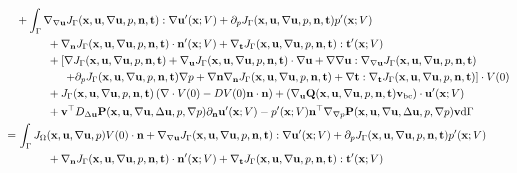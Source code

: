 \documentclass[oneside,11pt]{book}
\numberwithin{equation}{section}
\begin{document}
\begin{equation*}
{\begin{split}
            &+ \int_\Gamma \nabla_{\nabla{\bf u}}J_\Gamma({\bf x},{\bf u},\nabla{\bf u},p,{\bf n},{\bf t}):\nabla{\bf u}'({\bf x};V) + \partial_pJ_\Gamma({\bf x},{\bf u},\nabla{\bf u},p,{\bf n},{\bf t})p'({\bf x};V)\\
            &\hspace{1cm}+ \nabla_{\bf n}J_\Gamma({\bf x},{\bf u},\nabla{\bf u},p,{\bf n},{\bf t})\cdot{\bf n}'({\bf x};V) + \nabla_{\bf t}J_\Gamma({\bf x},{\bf u},\nabla{\bf u},p,{\bf n},{\bf t}):{\bf t}'({\bf x};V)\\
            &\hspace{1cm}+ \left[\nabla J_\Gamma({\bf x},{\bf u},\nabla{\bf u},p,{\bf n},{\bf t}) + \nabla_{\bf u}J_\Gamma({\bf x},{\bf u},\nabla{\bf u},p,{\bf n},{\bf t})\cdot\nabla{\bf u} + \nabla\nabla{\bf u}:\nabla_{\nabla{\bf u}}J_\Gamma({\bf x},{\bf u},\nabla{\bf u},p,{\bf n},{\bf t})\right.\\
            &\hspace{15mm} \left.+ \partial_pJ_\Gamma({\bf x},{\bf u},\nabla{\bf u},p,{\bf n},{\bf t})\nabla p + \nabla{\bf n}\nabla_{\bf n}J_\Gamma({\bf x},{\bf u},\nabla{\bf u},p,{\bf n},{\bf t}) + \nabla{\bf t}:\nabla_{\bf t}J_\Gamma({\bf x},{\bf u},\nabla{\bf u},p,{\bf n},{\bf t})\right]\cdot V(0)\\
            &\hspace{1cm}+ J_\Gamma({\bf x},{\bf u},\nabla{\bf u},p,{\bf n},{\bf t})\left(\nabla\cdot V(0) - DV(0){\bf n}\cdot{\bf n}\right) + \left(\nabla_{\bf u}{\bf Q}({\bf x},{\bf u},\nabla{\bf u},p,{\bf n},{\bf t}){\bf v}_{\rm bc}\right)\cdot{\bf u}'({\bf x};V)\\
            &\hspace{1cm}+ {\bf v}^\top D_{\Delta{\bf u}}{\bf P}({\bf x},{\bf u},\nabla{\bf u},\Delta{\bf u},p,\nabla p)\partial_{\bf n}{\bf u}'({\bf x};V) - p'({\bf x};V){\bf n}^\top\nabla_{\nabla p}{\bf P}({\bf x},{\bf u},\nabla{\bf u},\Delta{\bf u},p,\nabla p){\bf v}{\rm d}\Gamma\\
            =&\, \int_\Gamma J_\Omega({\bf x},{\bf u},\nabla{\bf u},p)V(0)\cdot{\bf n} + \nabla_{\nabla{\bf u}}J_\Gamma({\bf x},{\bf u},\nabla{\bf u},p,{\bf n},{\bf t}):\nabla{\bf u}'({\bf x};V) + \partial_pJ_\Gamma({\bf x},{\bf u},\nabla{\bf u},p,{\bf n},{\bf t})p'({\bf x};V)\\
            &\hspace{1cm}+ \nabla_{\bf n}J_\Gamma({\bf x},{\bf u},\nabla{\bf u},p,{\bf n},{\bf t})\cdot{\bf n}'({\bf x};V) + \nabla_{\bf t}J_\Gamma({\bf x},{\bf u},\nabla{\bf u},p,{\bf n},{\bf t}):{\bf t}'({\bf x};V)\\

\end{split}}
\end{equation*}
\end{document}
